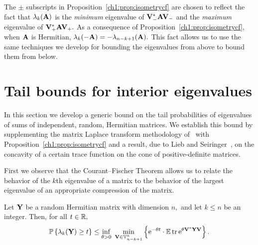 The $\pm$ subscripts in Proposition~\ref{ch1:prop:isometrycf} are chosen to reflect
the fact that $\lambda_k(\mathbf{A})$ is the \emph{minimum} eigenvalue of
$\mathbf{V}_-^*\mathbf{A}\mathbf{V}_-$ and the \emph{maximum} eigenvalue of
$\mathbf{V}_+^* \mathbf{A} \mathbf{V}_+.$ 
As a consequence of Proposition~\ref{ch1:prop:isometrycf}, when $\mathbf{A}$ is
Hermitian, \mbox{$\lambda_k(-\mathbf{A}) = -\lambda_{n-k+1}(\mathbf{A}).$} This
fact allows us to use the same techniques we develop for bounding the
eigenvalues from above to bound them from below.

\section{Tail bounds for interior eigenvalues}
\label{ch1:sec:laplacetransform}
In this section we develop a generic bound on the tail probabilities of
eigenvalues of sums of independent, random, Hermitian matrices. We establish
this bound by supplementing the matrix Laplace transform methodology of~\cite{T10a} 
with Proposition~\ref{ch1:prop:isometrycf} and a result, due to Lieb
and Seiringer~\cite{LS05}, on the concavity of a certain trace function on the
cone of positive-definite matrices.

 First we observe that the Courant--Fischer Theorem allows us to relate the
behavior of the $k$th eigenvalue of a matrix to the behavior of the largest
eigenvalue of an appropriate compression of the matrix.


\begin{thm}
Let $\mathbf{Y}$ be a random Hermitian matrix with dimension $n,$ and let $k
\leq n$ be an integer. Then, for all $t \in \mathbb{R},$
\begin{equation}
\mathbb{P}\left\{\lambda_k(\mathbf{Y}) \geq t\right\} \leq \inf_{\theta > 0}\,\, \min_{\mathbf{V} \in
\mathbb{V}_{n-k+1}^{n}} \left\{ \mathrm{e}^{-\theta t} \cdot \mathbb{E}\operatorname{tr}\mathrm{e}^{\theta
\mathbf{V}^*\mathbf{YV}} \right\}.
\label{ch1:eqn:laplacetform}
\end{equation}
\label{ch1:thm:laplacetform}
\end{thm}

